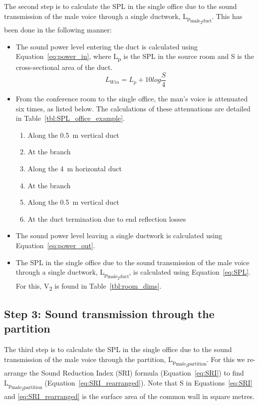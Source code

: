 The second step is to calculate the SPL in the single office due to the sound transmission of the male voice through a single ductwork, L\textsubscript{p\textsubscript{male\textsubscript{2}duct}}.
This has been done in the following manner:
\begin{itemize}
	\item The sound power level entering the duct is calculated using Equation~\ref{eq:power_in}, where L\textsubscript{p} is the SPL in the source room and S is the cross-sectional area of the duct.
		\begin{equation}\label{eq:power_in}
			L_{W in} = L_{p} + 10 log \frac{S}{4}
		\end{equation}
	\item From the conference room to the single office, the man's voice is attenuated six times, as listed below. The calculations of these attenuations are detailed in Table~\ref{tbl:SPL_office_example}.
		\begin{enumerate}
			\item Along the 0.5~m vertical duct
			\item At the branch
			\item Along the 4~m horizontal duct
			\item At the branch
			\item Along the 0.5~m vertical duct
			\item At the duct termination due to end reflection losses
		\end{enumerate}
	\item The sound power level leaving a single ductwork is calculated using Equation~\ref{eq:power_out}.
	\item The SPL in the single office due to the sound transmission of the male voice through a single ductwork, L\textsubscript{p\textsubscript{male\textsubscript{2}duct}}, is calculated using Equation~\ref{eq:SPL}. For this, V\textsubscript{2} is found in Table~\ref{tbl:room_dims}.
\end{itemize}


\subsection{Step 3: Sound transmission through the partition}

The third step is to calculate the SPL in the single office due to the sound transmission of the male voice through the partition, L\textsubscript{p\textsubscript{male\textsubscript{2}partition}}.
For this we re-arrange the Sound Reduction Index (SRI) formula (Equation~\ref{eq:SRI}) to find L\textsubscript{p\textsubscript{male\textsubscript{2}partition}} (Equation~\ref{eq:SRI_rearranged}).
Note that S in Equations~\ref{eq:SRI} and \ref{eq:SRI_rearranged} is the surface area of the common wall in square metres.

